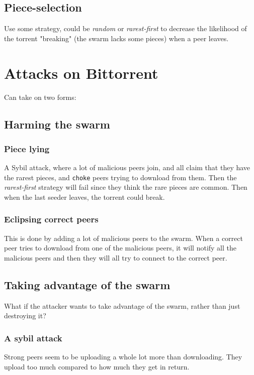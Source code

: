 	\subsection{Piece-selection}
	Use some strategy, could be \textit{random} or \textit{rarest-first} to decrease the likelihood of the torrent "breaking" (the swarm lacks some pieces) when a peer leaves.
	
	\section{Attacks on Bittorrent}
	Can take on two forms:
	
	\subsection{Harming the swarm}
	
	\subsubsection{Piece lying}
	A Sybil attack, where a lot of malicious peers join, and all claim that they have the rarest pieces, and \texttt{choke} peers trying to download from them. Then the \textit{rarest-first} strategy will fail since they think the rare pieces are common. Then when the last seeder leaves, the torrent could break.
	
	\subsubsection{Eclipsing correct peers}
	This is done by adding a lot of malicious peers to the swarm. When a correct peer tries to download from one of the malicious peers, it will notify all the malicious peers and then they will all try to connect to the correct peer.
	
	\subsection{Taking advantage of the swarm}
	What if the attacker wants to take advantage of the swarm, rather than just destroying it?
	
	\subsubsection{A sybil attack}
	Strong peers seem to be uploading a whole lot more than downloading. They upload too much compared to how much they get in return.
	
